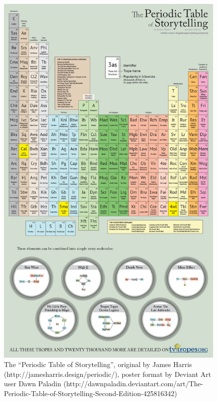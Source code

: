 \documentclass[11pt]{report}
\begin{document}
\begin{figure}[p!]
\centerline{\includegraphics[height=\textheight]{periodicTable.png}}
\caption{The ``Periodic Table of Storytelling'', original by James Harris
  (http://jamesharris.design/periodic/), poster format by Deviant Art user Dawn
  Paladin (http://dawnpaladin.deviantart.com/art/The-Periodic-Table-of-Storytelling-Second-Edition-425816342)} \label{fig:periodic-table}
\end{figure}
\end{document}
